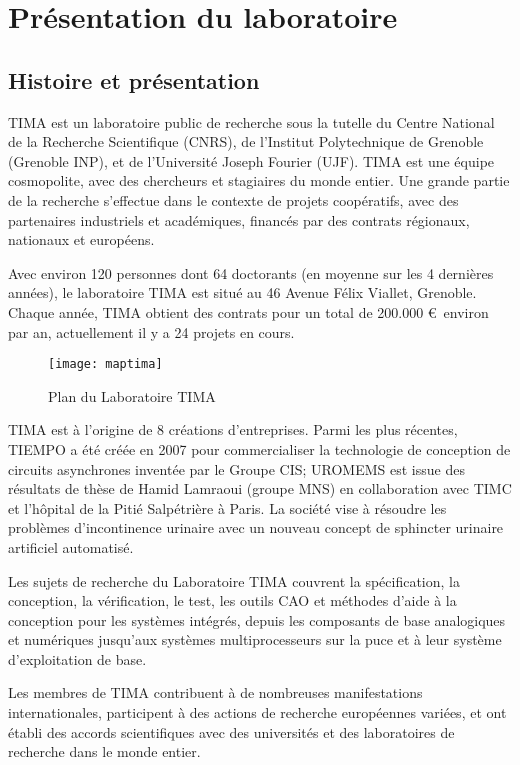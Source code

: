 \chapter{Présentation du laboratoire}
\label{chap:presentation}
\OnehalfSpacing

\section{Histoire et présentation}
TIMA est un laboratoire public de recherche sous la tutelle du Centre National de la Recherche Scientifique 
(CNRS), de l'Institut Polytechnique de Grenoble (Grenoble INP), et de l'Université Joseph Fourier (UJF). 
TIMA est une équipe cosmopolite, avec des chercheurs et stagiaires du monde entier. Une grande partie de la recherche s'effectue dans le contexte de projets coopératifs, avec des partenaires industriels et académiques, financés par des contrats régionaux, nationaux et européens.

Avec environ 120 personnes dont 64 doctorants (en moyenne sur les 4 dernières années), le laboratoire TIMA est situé au 46 Avenue Félix Viallet, Grenoble. Chaque année, TIMA obtient des contrats pour un total de 200.000 \euro\  environ par an, actuellement il y a 24 projets en cours.
\begin{figure}[h]
	\label{fig:maptima}
	\centering
	\texttt{[image: maptima]}
	\caption{Plan du Laboratoire TIMA}
	\vspace{-5mm}
\end{figure}

\justify
TIMA est à l'origine de 8 créations d'entreprises. Parmi les plus récentes, TIEMPO a été créée en 2007 pour commercialiser la technologie de conception de circuits asynchrones inventée par le Groupe CIS; UROMEMS est issue des résultats de thèse de Hamid Lamraoui (groupe MNS) en collaboration avec TIMC et l'hôpital de la Pitié Salpétrière à Paris. La société vise à résoudre les problèmes d'incontinence urinaire avec un nouveau concept de sphincter urinaire artificiel automatisé.

Les sujets de recherche du Laboratoire TIMA couvrent la spécification, la conception, la vérification, le test, les outils CAO et méthodes d'aide à la conception pour les systèmes intégrés, depuis les composants de base analogiques et numériques jusqu'aux systèmes multiprocesseurs sur la puce et à leur système d'exploitation de base.

Les membres de TIMA contribuent à de nombreuses manifestations internationales, participent à des actions de recherche européennes variées, et ont établi des accords scientifiques avec des universités et des laboratoires de recherche dans le monde entier.

